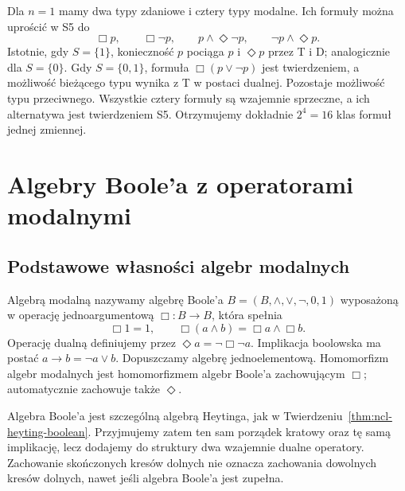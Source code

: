 \begin{przyklad}
\label{ex:ncl-modal-S5-one-variable}
Dla $n=1$ mamy dwa typy zdaniowe i cztery
typy modalne. Ich formuły można uprościć
w S5 do
\[
 \Box p,\qquad \Box\neg p,\qquad
 p\wedge\Diamond\neg p,\qquad
 \neg p\wedge\Diamond p.
\]
Istotnie, gdy $S=\{1\}$, konieczność $p$
pociąga $p$ i $\Diamond p$ przez T i D;
analogicznie dla $S=\{0\}$.
Gdy $S=\{0,1\}$, formuła
$\Box(p\vee\neg p)$ jest twierdzeniem,
a możliwość bieżącego typu wynika z T
w postaci dualnej. Pozostaje możliwość
typu przeciwnego.
Wszystkie cztery formuły są wzajemnie sprzeczne,
a ich alternatywa jest twierdzeniem S5.
Otrzymujemy dokładnie $2^4=16$ klas
formuł jednej zmiennej.
\end{przyklad}

\section{Algebry Boole'a z operatorami modalnymi}

\subsection{Podstawowe własności algebr modalnych}

\begin{definicja}
\label{def:ncl-modal-algebra}
Algebrą modalną nazywamy algebrę Boole'a
$B=(B,\wedge,\vee,\neg,0,1)$ wyposażoną w
operację jednoargumentową $\Box:B\to B$,
która spełnia
\[
 \Box1=1,\qquad
 \Box(a\wedge b)=\Box a\wedge\Box b.
\]
Operację dualną definiujemy przez
$\Diamond a=\neg\Box\neg a$.
Implikacja boolowska ma postać $a\to b=\neg a\vee b$.
Dopuszczamy algebrę jednoelementową.
Homomorfizm algebr modalnych jest homomorfizmem
algebr Boole'a zachowującym $\Box$; automatycznie
zachowuje także $\Diamond$.
\end{definicja}
Algebra Boole'a jest szczególną algebrą Heytinga,
jak w Twierdzeniu~\ref{thm:ncl-heyting-boolean}.
Przyjmujemy zatem ten sam porządek kratowy oraz
tę samą implikację, lecz dodajemy do struktury
dwa wzajemnie dualne operatory.
Zachowanie skończonych kresów dolnych nie oznacza
zachowania dowolnych kresów dolnych, nawet jeśli
algebra Boole'a jest zupełna.

